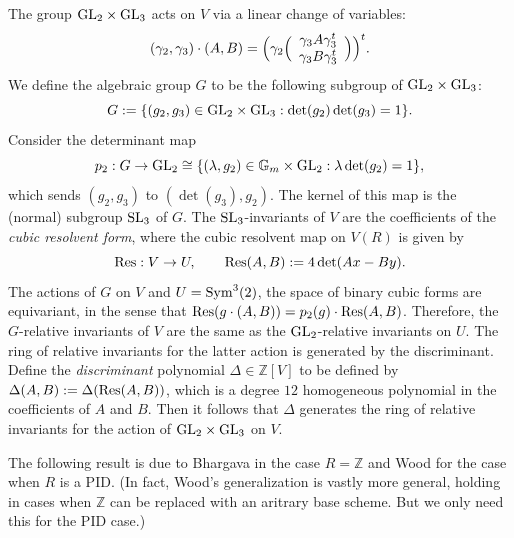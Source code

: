 \documentclass{article}
\def\Z{{\mathbb Z}}
\def\SL{{\rm SL}}
\def\GL{{\rm GL}}
\def\Sym{{\rm Sym}}
\def\Res{{\rm Res}}
\def\Z{{\mathbb Z}}
\begin{document}
The group $\GL_2\times\GL_3$ acts on $V$ via a linear change of variables:
\begin{equation*}
(\gamma_2,\gamma_3)\cdot(A,B)=\Bigl(\gamma_2\Bigl(
\begin{array}{c} \gamma_3A\gamma_3^t\\\gamma_3B\gamma_3^t\end{array}\Bigr)\Bigr)^t.
\end{equation*}
We define the algebraic group $G$ to be the following subgroup of $\GL_2\times\GL_3$:
\begin{equation}\label{eq:G_definition}
G:=\{(g_2,g_3)\in\GL_2\times\GL_3:\det(g_2)\det(g_3)=1\}.
\end{equation}
Consider the determinant map
\begin{equation*}
p_2:G\to \GL_2\cong\{(\lambda,g_2)\in\mathbb{G}_m\times\GL_2 :\lambda\det(g_2)=1\},
\end{equation*}
which sends $(g_2,g_3)$ to $(\det(g_3),g_2)$. The kernel of this map is the (normal) subgroup $\SL_3$ of $G$.
The $\SL_3$-invariants of $V$ are the coefficients of the {\it cubic resolvent form}, where the cubic resolvent map on $V(R)$ is given by
\begin{equation*}
\Res:V\to U,\quad\quad\Res(A,B):=4\det(Ax-By).
\end{equation*}
The actions of $G$ on $V$ and $U=\Sym^3(2)$, the space of binary cubic forms are equivariant, in the sense that $\Res(g\cdot(A,B))=p_2(g)\cdot\Res(A,B)$. Therefore, the $G$-relative invariants of $V$ are the same as the $\GL_2$-relative invariants on $U$. The ring of relative invariants for the latter action is generated by the discriminant. Define the {\it discriminant} polynomial $\Delta\in\Z[V]$ to be defined by $\Delta(A,B):=\Delta(\Res(A,B))$, which is a degree $12$ homogeneous polynomial in the coefficients of $A$ and $B$. Then it follows that $\Delta$ generates the ring of relative invariants for the action of $\GL_2\times\GL_3$ on $V$.

The following result is due to Bhargava \cite{BHCL3} in the case $R=\Z$ and Wood \cite{WoodThesis,MR2948473} for the case when $R$ is a PID. (In fact, Wood's generalization is vastly more general, holding in cases when $\Z$ can be replaced with an aritrary base scheme. But we only need this for the PID case.)
\end{document}
